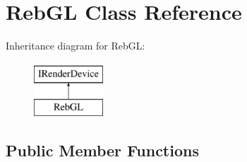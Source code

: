 \hypertarget{class_reb_g_l}{}\section{Reb\+GL Class Reference}
\label{class_reb_g_l}
Inheritance diagram for Reb\+GL\+:\begin{figure}[H]
\begin{center}
\leavevmode
\includegraphics[height=2.000000cm]{class_reb_g_l}
\end{center}
\end{figure}
\subsection*{Public Member Functions}

